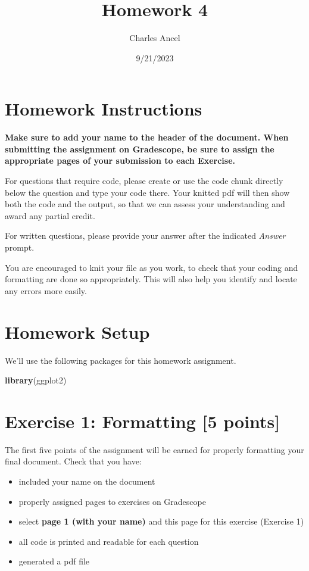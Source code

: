\documentclass[
]{article}
\title{Homework 4}
\author{Charles Ancel}
\date{9/21/2023}
\newenvironment{Shaded}{\begin{snugshade}}{\end{snugshade}}
\newcommand{\FunctionTok}[1]{\textcolor[rgb]{0.13,0.29,0.53}{\textbf{#1}}}
\newcommand{\NormalTok}[1]{#1}
\providecommand{\tightlist}{%
  \setlength{\itemsep}{0pt}\setlength{\parskip}{0pt}}
\begin{document}
\maketitle

\section{Homework Instructions}\label{homework-instructions}

\textbf{Make sure to add your name to the header of the document. When
submitting the assignment on Gradescope, be sure to assign the
appropriate pages of your submission to each Exercise.}

For questions that require code, please create or use the code chunk
directly below the question and type your code there. Your knitted pdf
will then show both the code and the output, so that we can assess your
understanding and award any partial credit.

For written questions, please provide your answer after the indicated
\emph{Answer} prompt.

You are encouraged to knit your file as you work, to check that your
coding and formatting are done so appropriately. This will also help you
identify and locate any errors more easily.

\section{Homework Setup}\label{homework-setup}

We'll use the following packages for this homework assignment.

\begin{Shaded}
\begin{Highlighting}[]
\FunctionTok{library}\NormalTok{(ggplot2)}
\end{Highlighting}
\end{Shaded}

\section{Exercise 1: Formatting {[}5
points{]}}\label{exercise-1-formatting-5-points}

The first five points of the assignment will be earned for properly
formatting your final document. Check that you have:

\begin{itemize}
\tightlist
\item
  included your name on the document
\item
  properly assigned pages to exercises on Gradescope
\item
  select \textbf{page 1 (with your name)} and this page for this
  exercise (Exercise 1)
\item
  all code is printed and readable for each question
\item
  generated a pdf file
\end{itemize}
\end{document}
